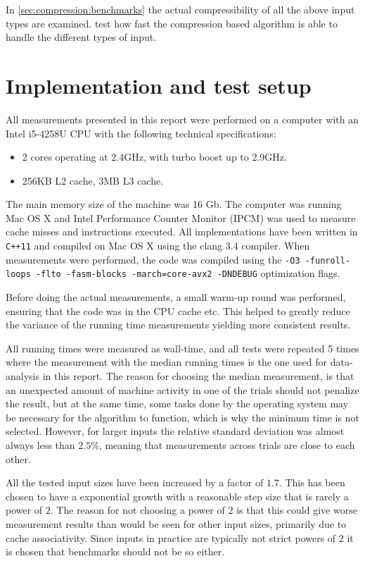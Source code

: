 \documentclass[twoside,11pt,openright]{report}
\begin{document}
In \cref{sec:compression:benchmarks} the actual compressibility of all the above input types are examined.  test how fast the compression based algorithm is able to handle the different types of input.

\clearpage
\section{Implementation and test setup}
All measurements presented in this report were performed on a computer with an Intel i5-4258U CPU with the following technical specifications:
\begin{itemize}
  \item 2 cores operating at 2.4GHz, with turbo boost up to 2.9GHz.
  \item 256KB L2 cache, 3MB L3 cache.
\end{itemize}
The main memory size of the machine was 16 Gb. The computer was running Mac OS X and Intel Performance Counter Monitor (IPCM) was used to measure cache misses and instructions executed. All implementations have been written in \texttt{C++11} and compiled on  Mac OS X using the clang 3.4 compiler. When measurements were performed, the code was compiled using the \texttt{-O3 -funroll-loops -flto -fasm-blocks -march=core-avx2 -DNDEBUG} optimization flags.

Before doing the actual measurements, a small warm-up round was performed, ensuring that the code was in the CPU cache etc. This helped to greatly reduce the variance of the running time measurements yielding more consistent results.

All running times were measured as wall-time, and all tests were repeated 5 times where the measurement with the median running times is the one used for data-analysis in this report. The reason for choosing the median measurement, is that an unexpected amount of machine activity in one of the trials should not penalize the result, but at the same time, some tasks done by the operating system may be necessary for the algorithm to function, which is why the minimum time is not selected. However, for larger inputs the relative standard deviation was almost always less than $2.5\%$, meaning that measurements across trials are close to each other.

All the tested input sizes have been increased by a factor of $1.7$. This has been chosen to have a exponential growth with a reasonable step size that is rarely a power of $2$. The reason for not choosing a power of $2$ is that this could give worse measurement results than would be seen for other input sizes, primarily due to cache associativity. Since inputs in practice are typically not strict powers of $2$ it is chosen that benchmarks should not be so either.
\end{document}
